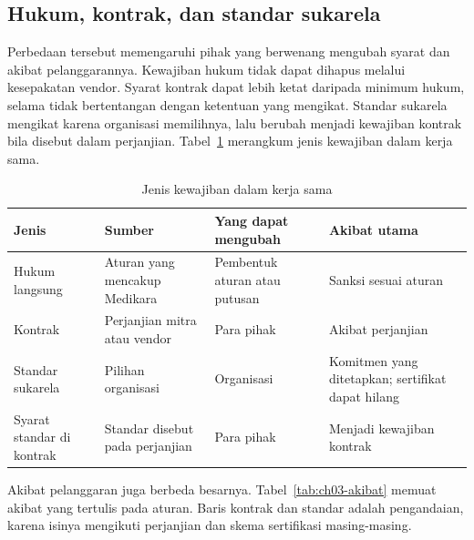 \subsection*{Hukum, kontrak, dan standar sukarela}

Perbedaan tersebut memengaruhi pihak yang berwenang mengubah syarat dan akibat pelanggarannya. Kewajiban
hukum tidak dapat dihapus melalui kesepakatan vendor. Syarat kontrak dapat lebih ketat daripada minimum hukum,
selama tidak bertentangan dengan ketentuan yang mengikat. Standar sukarela mengikat karena organisasi memilihnya,
lalu berubah menjadi kewajiban kontrak bila disebut dalam perjanjian. Tabel~\ref{tab:ch03-mitra} merangkum jenis
kewajiban dalam kerja sama.

\begin{table}[!htb]
  \centering\small
  \caption{Jenis kewajiban dalam kerja sama}\label{tab:ch03-mitra}
  \begin{tabularx}{\textwidth}{|>{\raggedright\arraybackslash}p{}|>{\raggedright\arraybackslash}X|>{\raggedright\arraybackslash}X|>{\raggedright\arraybackslash}X|}
    \hline
    \textbf{Jenis} & \textbf{Sumber} & \textbf{Yang dapat mengubah} & \textbf{Akibat utama} \\ \hline
    Hukum langsung & Aturan yang mencakup Medikara & Pembentuk aturan atau putusan & Sanksi sesuai aturan \\
    \hline
    Kontrak & Perjanjian mitra atau vendor & Para pihak & Akibat perjanjian \\ \hline
    Standar sukarela & Pilihan organisasi & Organisasi & Komitmen yang ditetapkan; sertifikat dapat hilang \\
    \hline
    Syarat standar di kontrak & Standar disebut pada perjanjian & Para pihak & Menjadi kewajiban kontrak \\
    \hline
  \end{tabularx}
\end{table}

Akibat pelanggaran juga berbeda besarnya. Tabel~\ref{tab:ch03-akibat} memuat akibat yang tertulis pada aturan.
Baris kontrak dan standar adalah pengandaian, karena isinya mengikuti perjanjian dan skema sertifikasi
masing-masing.


